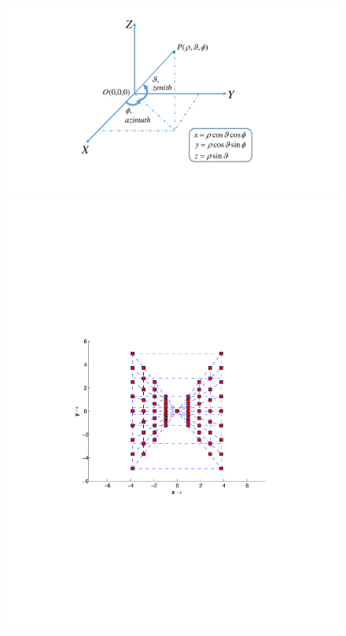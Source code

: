 \documentclass{UCF_ETD}
\begin{document}
 \begin{figure}[H]
 \begin{center}
 \includegraphics[scale=0.65]{PolarSphericalDFT/SimpleConventions3D}
 \includegraphics[scale=0.6]{PolarSphericalDFT/ButterflyGrid2D}

\end{center}
\end{figure}
\end{document}
